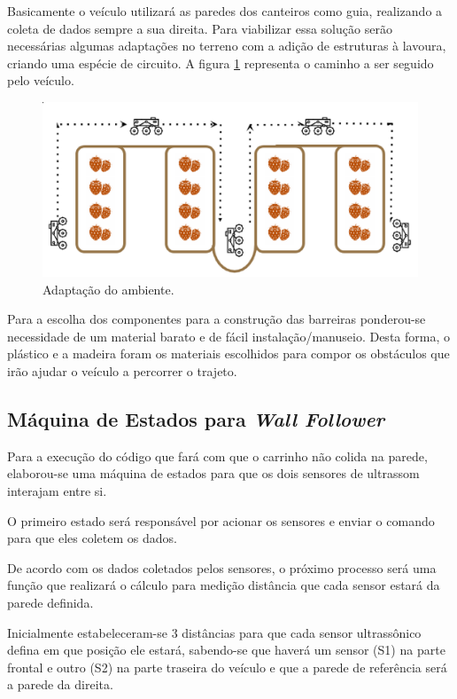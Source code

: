     \vfill
    \pagebreak

    Basicamente o veículo utilizará as paredes dos canteiros como guia, realizando a
    coleta de dados sempre a sua direita. Para viabilizar essa solução serão necessárias algumas adaptações no terreno com a adição de estruturas à lavoura, criando uma espécie de circuito. A figura \ref{fig:ambientadapt} representa o caminho a ser seguido pelo veículo.

    \begin{figure}[!htbp]
    \begin{center}
    \includegraphics[width=.7\textwidth]{figuras/adapt.eps}
    \caption{\label{fig:ambientadapt}Adaptação do ambiente.}
    \end{center}
    \end{figure}

    \vfill
    \pagebreak

    Para a escolha dos componentes para a construção das barreiras ponderou-se
    necessidade de um material barato e de fácil instalação/manuseio.
    Desta forma, o plástico e a madeira foram os materiais escolhidos para compor os obstáculos
    que irão ajudar o veículo a percorrer o trajeto.

  \subsection{Máquina de Estados para \textit{Wall Follower}}
  Para a execução do código que fará com que o carrinho não colida na parede, elaborou-se uma máquina de estados para que os dois sensores de ultrassom interajam entre si.

  O primeiro estado será responsável por acionar os sensores e enviar o comando para que eles coletem os dados.

  De acordo com os dados coletados pelos sensores, o próximo processo será uma função que realizará o cálculo para medição distância que cada sensor estará da parede definida.

  Inicialmente estabeleceram-se 3 distâncias para que cada sensor ultrassônico defina em que posição ele estará, sabendo-se que haverá um sensor (S1) na parte frontal e outro (S2) na parte traseira do veículo e que a parede de referência será a parede da direita.

